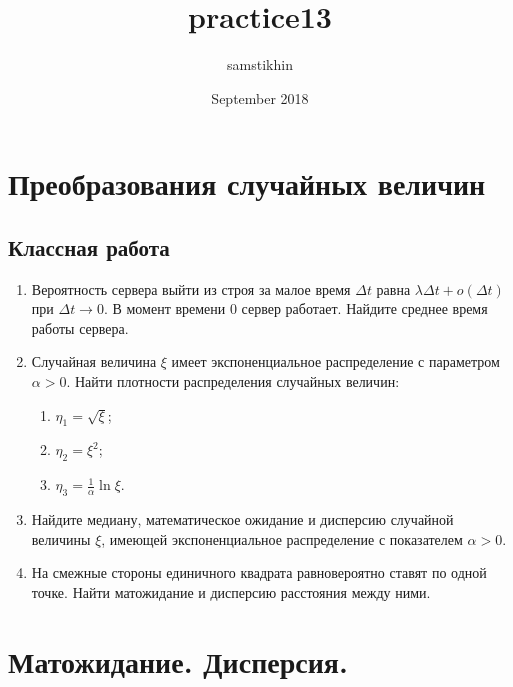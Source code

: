 \documentclass[a4paper, 14pt]{extarticle}
\title{practice13}
\author{samstikhin}
\date{September 2018}
\begin{document}
\section*{Преобразования случайных величин}
\subsection*{Классная работа}
\begin{enumerate}
	\item Вероятность сервера выйти из строя за малое время $\Delta t$ равна $\lambda\Delta t+o(\Delta t)$ при $\Delta t \to 0$. В момент времени 0 сервер работает. Найдите среднее время работы сервера. 
\item Случайная величина $\xi$ имеет экспоненциальное
	распределение с параметром $\alpha > 0$.
	Найти плотности распределения случайных величин:
	\begin{enumerate}
	\item 
	$\eta_1=\sqrt{\xi}$;
	\item $\eta_2=\xi^2$;
	\item 	$\eta_3=\frac{1}{\alpha}\ln \xi$.
	\end{enumerate}
\item Найдите медиану, математическое ожидание и дисперсию случайной величины $\xi$, имеющей экспоненциальное распределение с показателем $\alpha>0$. 
\item На смежные стороны единичного квадрата равновероятно ставят по одной точке. Найти матожидание и дисперсию расстояния между ними.  
  
\end{enumerate}

\newpage

\section*{Матожидание. Дисперсия.}
\end{document}
